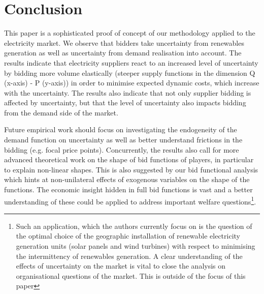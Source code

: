 \section{Conclusion}
\label{conclusion}
This paper is a sophisticated proof of concept of our methodology applied to the electricity market. We observe that bidders take uncertainty from renewables generation as well as uncertainty from demand realisation into account. The results indicate that electricity suppliers react to an increased level of uncertainty by bidding more volume elastically (steeper supply functions in the dimension Q (x-axis) - P (y-axis)) in order to minimise expected dynamic costs, which increase with the uncertainty. The results also indicate that not only supplier bidding is affected by uncertainty, but that the level of uncertainty also impacts bidding from the demand side of the market. 

Future empirical work should focus on investigating the endogeneity of the demand function on uncertainty as well as better understand frictions in the bidding (e.g. focal price points). Concurrently, the results also call for more advanced theoretical work on the shape of bid functions of players, in particular to explain non-linear shapes. This is also suggested by our bid functional analysis which hints at non-unilateral effects of exogenous variables on the shape of the functions. The economic insight hidden in full bid functions is vast and a better understanding of these could be applied to address important welfare questions\footnote{Such an application, which the authors currently focus on is the question of the optimal choice of the geographic installation of renewable electricity generation units (solar panels and wind turbines) with respect to minimising the intermittency of renewables generation. A clear understanding of the effects of uncertainty on the market is vital to close the analysis on organisational questions of the market. This is outside of the focus of this paper}.\\








%	
%
%






